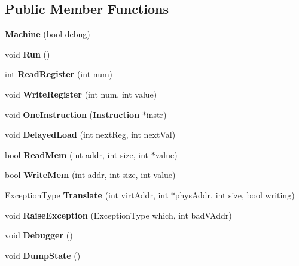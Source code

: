 \subsection*{Public Member Functions}
\begin{DoxyCompactItemize}
\item 
{\bfseries Machine} (bool debug)\label{class_machine_ad5958275a54dbc299b71ecdba7da0604}

\item 
void {\bfseries Run} ()\label{class_machine_a83444e06eb7a7c163a1b9c87a7062d43}

\item 
int {\bfseries Read\+Register} (int num)\label{class_machine_a6a8ed459cb3700c406564db72957bae3}

\item 
void {\bfseries Write\+Register} (int num, int value)\label{class_machine_ad58cc61e347395586a1cb91272dc4d61}

\item 
void {\bfseries One\+Instruction} ({\bf Instruction} $\ast$instr)\label{class_machine_af8d77f2964313173f1bada56bc596e48}

\item 
void {\bfseries Delayed\+Load} (int next\+Reg, int next\+Val)\label{class_machine_a11fda0ddf1f16d8b1a06f75d1ab5b8a1}

\item 
bool {\bfseries Read\+Mem} (int addr, int size, int $\ast$value)\label{class_machine_a01f1647867db027c04b6290b46dd988d}

\item 
bool {\bfseries Write\+Mem} (int addr, int size, int value)\label{class_machine_a1f442601e649b537a65b8b2440342227}

\item 
Exception\+Type {\bfseries Translate} (int virt\+Addr, int $\ast$phys\+Addr, int size, bool writing)\label{class_machine_a754ddcbc077cc91463398de8b0f1d077}

\item 
void {\bfseries Raise\+Exception} (Exception\+Type which, int bad\+V\+Addr)\label{class_machine_a0d6f63790c0568437b100171f61fd77f}

\item 
void {\bfseries Debugger} ()\label{class_machine_a08d36bd75e689830c73e307e1c7f7e28}

\item 
void {\bfseries Dump\+State} ()\label{class_machine_a4e4dee4ed66da41de9bbebb161efd06f}

\end{DoxyCompactItemize}
